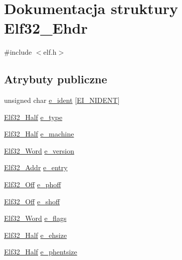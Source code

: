 \hypertarget{struct_elf32___ehdr}{\section{Dokumentacja struktury Elf32\-\_\-\-Ehdr}
\label{struct_elf32___ehdr}
}


{\ttfamily \#include $<$elf.\-h$>$}

\subsection*{Atrybuty publiczne}
\begin{DoxyCompactItemize}
\item 
unsigned char \hyperlink{struct_elf32___ehdr_aba47ac5e0af02d5668782f1fd5a7466c}{e\-\_\-ident} \mbox{[}\hyperlink{elf_8h_ae407130db14180c6737390604ba7c1fe}{E\-I\-\_\-\-N\-I\-D\-E\-N\-T}\mbox{]}
\item 
\hyperlink{elf_8h_a2ff0787d7d1bae0f251192806a2974ca}{Elf32\-\_\-\-Half} \hyperlink{struct_elf32___ehdr_a49e40a791813c06e3b6ebcb53aef1bb8}{e\-\_\-type}
\item 
\hyperlink{elf_8h_a2ff0787d7d1bae0f251192806a2974ca}{Elf32\-\_\-\-Half} \hyperlink{struct_elf32___ehdr_a19bca7faba9e5573814643efc3574c7b}{e\-\_\-machine}
\item 
\hyperlink{elf_8h_af5924ece606c732e86f8263a19408e45}{Elf32\-\_\-\-Word} \hyperlink{struct_elf32___ehdr_aa27627bda53281221325df4dd782e800}{e\-\_\-version}
\item 
\hyperlink{elf_8h_a40c6d4571e6001f443cc6a6474620158}{Elf32\-\_\-\-Addr} \hyperlink{struct_elf32___ehdr_ab8a982696048d807017919b7d0145482}{e\-\_\-entry}
\item 
\hyperlink{elf_8h_a655751f9b317369b93c581ea8ed84516}{Elf32\-\_\-\-Off} \hyperlink{struct_elf32___ehdr_a25c36fc010284a928604aae005b67ad1}{e\-\_\-phoff}
\item 
\hyperlink{elf_8h_a655751f9b317369b93c581ea8ed84516}{Elf32\-\_\-\-Off} \hyperlink{struct_elf32___ehdr_a00601af5187a1b3f8babfe9cddd95c15}{e\-\_\-shoff}
\item 
\hyperlink{elf_8h_af5924ece606c732e86f8263a19408e45}{Elf32\-\_\-\-Word} \hyperlink{struct_elf32___ehdr_a87cf481be7917fafde0c4ecf78c8e574}{e\-\_\-flags}
\item 
\hyperlink{elf_8h_a2ff0787d7d1bae0f251192806a2974ca}{Elf32\-\_\-\-Half} \hyperlink{struct_elf32___ehdr_a04c658023e50479eed64f6d1b00a2504}{e\-\_\-ehsize}
\item 
\hyperlink{elf_8h_a2ff0787d7d1bae0f251192806a2974ca}{Elf32\-\_\-\-Half} \hyperlink{struct_elf32___ehdr_afa2289f96d86fcc568a3b1f40cc8953e}{e\-\_\-phentsize}

\end{DoxyCompactItemize}
